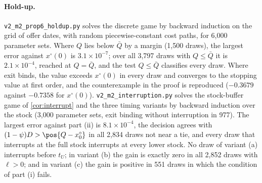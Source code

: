 \paragraph{Hold-up.} \texttt{v2\_m2\_prop6\_holdup.py} solves the discrete game by backward induction on the grid of offer dates, with random piecewise-constant cost paths, for 6,000 parameter sets. Where $Q$ lies below $\bar Q$ by a margin (1,500 draws), the largest error against $x^\circ(0)$ is $3.1\times10^{-7}$; over all 3,797 draws with $Q\le\bar Q$ it is $2.1\times10^{-4}$, reached at $Q=\bar Q$, and the test $Q\le\bar Q$ classifies every draw. Where exit binds, the value exceeds $x^\circ(0)$ in every draw and converges to the stopping value at first order, and the counterexample in the proof is reproduced ($-0.3679$ against $-0.7358$ for $x^\circ(0)$). \texttt{v2\_m2\_interruption.py} solves the stock-buffer game of \cref{cor:interrupt} and the three timing variants by backward induction over the stock (3,000 parameter sets, exit binding without interruption in 977). The largest error against part (ii) is $8.1\times10^{-4}$, the decision agrees with $(1-\psi)D>\pos{Q-x^\circ_0}$ in all 2,834 draws not near a tie, and every draw that interrupts at the full stock interrupts at every lower stock. No draw of variant (a) interrupts before $t_U$; in variant (b) the gain is exactly zero in all 2,852 draws with $\ell>0$; and in variant (c) the gain is positive in 551 draws in which the condition of part (i) fails.
